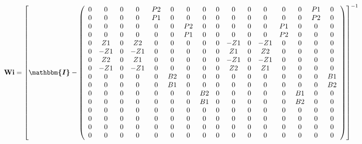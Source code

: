 \[ \mathbf{Wi} =  \left[ \boldsymbol{\mathbbm{I}}  -
\left(\begin{array}{cccccccccccccccc} 0 & 0 & 0 & 0 & P2 & 0 & 0 & 0 &
0 & 0 & 0 & 0 & 0 & 0 & P1 & 0 \\ 0 & 0 & 0 & 0 & P1 & 0 & 0 & 0 & 0 &
0 & 0 & 0 & 0 & 0 & P2 & 0 \\ 0 & 0 & 0 & 0 & 0 & 0 & P2 & 0 & 0 & 0 &
0 & 0 & P1 & 0 & 0 & 0 \\ 0 & 0 & 0 & 0 & 0 & 0 & P1 & 0 & 0 & 0 & 0 &
0 & P2 & 0 & 0 & 0 \\ 0 & Z1 & 0 & Z2 & 0 & 0 & 0 & 0 & 0 & -Z1 & 0 &
-Z1 & 0 & 0 & 0 & 0 \\ 0 & -Z1 & 0 & -Z1 & 0 & 0 & 0 & 0 & 0 & Z1 & 0
& Z2 & 0 & 0 & 0 & 0 \\ 0 & Z2 & 0 & Z1 & 0 & 0 & 0 & 0 & 0 & -Z1 & 0
& -Z1 & 0 & 0 & 0 & 0 \\ 0 & -Z1 & 0 & -Z1 & 0 & 0 & 0 & 0 & 0 & Z2 &
0 & Z1 & 0 & 0 & 0 & 0 \\ 0 & 0 & 0 & 0 & 0 & B2 & 0 & 0 & 0 & 0 & 0 &
0 & 0 & 0 & 0 & B1 \\ 0 & 0 & 0 & 0 & 0 & B1 & 0 & 0 & 0 & 0 & 0 & 0 &
0 & 0 & 0 & B2 \\ 0 & 0 & 0 & 0 & 0 & 0 & 0 & B2 & 0 & 0 & 0 & 0 & 0 &
B1 & 0 & 0 \\ 0 & 0 & 0 & 0 & 0 & 0 & 0 & B1 & 0 & 0 & 0 & 0 & 0 & B2
& 0 & 0 \\ 0 & 0 & 0 & 0 & 0 & 0 & 0 & 0 & 0 & 0 & 0 & 0 & 0 & 0 & 0 &
0 \\ 0 & 0 & 0 & 0 & 0 & 0 & 0 & 0 & 0 & 0 & 0 & 0 & 0 & 0 & 0 & 0 \\
0 & 0 & 0 & 0 & 0 & 0 & 0 & 0 & 0 & 0 & 0 & 0 & 0 & 0 & 0 & 0 \\ 0 & 0
& 0 & 0 & 0 & 0 & 0 & 0 & 0 & 0 & 0 & 0 & 0 & 0 & 0 & 0
\end{array}\right) \right]^{-1}  \]
